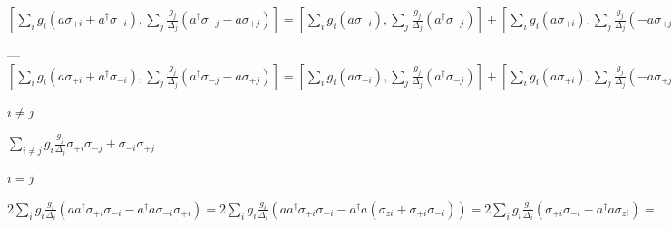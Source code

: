 \documentclass[11pt, spanish]{report}
\begin{document}
$[\sum\limits_i g_i (a \sigma_{+i} + a^\dagger \sigma_{-i}), \sum\limits_j \frac{g_j} {\Delta_j} (a^\dagger \sigma_{-j} - a \sigma_{+j})] = 
[\sum\limits_i g_i (a \sigma_{+i}), \sum\limits_j \frac{g_j} {\Delta_j} (a^\dagger \sigma_{-j})] +
[\sum\limits_i g_i (a \sigma_{+i}), \sum\limits_j \frac{g_j} {\Delta_j} (- a \sigma_{+j})] +
[\sum\limits_i g_i (a^\dagger \sigma_{-i}), \sum\limits_j \frac{g_j} {\Delta_j} (a^\dagger \sigma_{-j})] +
[\sum\limits_i g_i (a^\dagger \sigma_{-i}), \sum\limits_j \frac{g_j} {\Delta_j} (- a \sigma_{+j})] =
\sum\limits_{ij} g_i (a \sigma_{+i}) \frac{g_j} {\Delta_j} (a^\dagger \sigma_{-j}) -
\sum\limits_{ij} \frac{g_j} {\Delta_j} (a^\dagger \sigma_{-j}) g_i (a \sigma_{+i}) +
\sum\limits_{ij} g_i (a^\dagger \sigma_{-i}) \frac{g_j} {\Delta_j} (- a \sigma_{+j}) -
\sum\limits_{ij} \frac{g_j} {\Delta_j} (- a \sigma_{+j}) g_i (a^\dagger \sigma_{-i}) = 
\sum\limits_{ij} g_i \frac{g_j} {\Delta_j} a a^\dagger \sigma_{+i} \sigma_{-j} -
\sum\limits_{ij} g_i \frac{g_j} {\Delta_j} a^\dagger a \sigma_{-j} \sigma_{+i} -
\sum\limits_{ij} g_i \frac{g_j} {\Delta_j} a^\dagger a \sigma_{-i} \sigma_{+j} +
\sum\limits_{ij} g_i \frac{g_j} {\Delta_j} a a^\dagger \sigma_{+j} \sigma_{-i} = 
2 \sum\limits_{i \neq j} g_i \frac{g_j} {\Delta_j} \sigma_{+i} \sigma_{-j} +
\sum\limits_{i} g_i \frac{g_i} {\Delta_i} \sigma_{+i} \sigma_{-i} +
\sum\limits_{i} g_i \frac{g_i} {\Delta_i} \sigma_{+i} \sigma_{-i} -
2 \sum\limits_{i} g_i \frac{g_i} {\Delta_i} a^\dagger a \sigma_{zi} = $

---
$[\sum\limits_i g_i (a \sigma_{+i} + a^\dagger \sigma_{-i}), \sum\limits_j \frac{g_j} {\Delta_j} (a^\dagger \sigma_{-j} - a \sigma_{+j})] = 
[\sum\limits_i g_i (a \sigma_{+i}), \sum\limits_j \frac{g_j} {\Delta_j} (a^\dagger \sigma_{-j})] +
[\sum\limits_i g_i (a \sigma_{+i}), \sum\limits_j \frac{g_j} {\Delta_j} (- a \sigma_{+j})] +
[\sum\limits_i g_i (a^\dagger \sigma_{-i}), \sum\limits_j \frac{g_j} {\Delta_j} (a^\dagger \sigma_{-j})] +
[\sum\limits_i g_i (a^\dagger \sigma_{-i}), \sum\limits_j \frac{g_j} {\Delta_j} (- a \sigma_{+j})] $

$i \neq j$

$ \sum\limits_{i \neq j} g_i \frac{g_j} {\Delta_j} \sigma_{+i} \sigma_{-j} + \sigma_{-i} \sigma_{+j} $

$i = j$

$ 
2 \sum\limits_i g_i \frac{g_i} {\Delta_i} (a a^\dagger \sigma_{+i} \sigma_{-i} - a^\dagger a \sigma_{-i} \sigma_{+i}) =
2 \sum\limits_i g_i \frac{g_i} {\Delta_i} (a a^\dagger \sigma_{+i} \sigma_{-i} - a^\dagger a (\sigma_{zi} + \sigma_{+i} \sigma_{-i})) =
2 \sum\limits_i g_i \frac{g_i} {\Delta_i} (\sigma_{+i} \sigma_{-i} - a^\dagger a \sigma_{zi}) =
$
\end{document}
